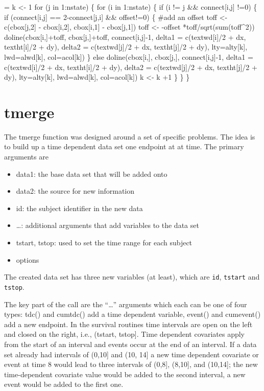 \documentclass{article}
\newcommand{\code}[1]{\texttt{#1}}
\begin{document}
\begin{nwchunk}
=
 k <- 1
 for (j in 1:nstate) \{
     for (i in 1:nstate) \{
         if (i != j && connect[i,j] !=0) \{
             if (connect[i,j] == 2-connect[j,i] && offset!=0) \{
                 #add an offset
                 toff <- c(cbox[j,2] - cbox[i,2], cbox[i,1] - cbox[j,1])
                 toff <- -offset *toff/sqrt(sum(toff^2))
                 doline(cbox[i,]+toff, cbox[j,]+toff, connect[i,j]-1,
                        delta1 = c(textwd[i]/2 + dx, textht[i]/2 + dy),
                        delta2 = c(textwd[j]/2 + dx, textht[j]/2 + dy),
                        lty=alty[k], lwd=alwd[k], col=acol[k])
                 \}
             else doline(cbox[i,], cbox[j,], connect[i,j]-1,
                         delta1 = c(textwd[i]/2 + dx, textht[i]/2 + dy),
                         delta2 = c(textwd[j]/2 + dx, textht[j]/2 + dy),
                         lty=alty[k], lwd=alwd[k], col=acol[k])
             k <- k +1
         \}
     \}
 \}
\end{nwchunk}
\section{tmerge}
The tmerge function was designed around a set of specific problems.
The idea is to build up a time dependent data set one endpoint at at time.
The primary arguments are
\begin{itemize}
  \item data1: the base data set that will be added onto
  \item data2: the source for new information
  \item id: the subject identifier in the new data
  \item \ldots: additional arguments that add variables to the data set
  \item tstart, tstop: used to set the time range for each subject
  \item options
\end{itemize}
The created data set has three new variables (at least), which are
\code{id}, \code{tstart} and \code{tstop}.

The key part of the call are the ``\ldots'' arguments 
which each can be one of four types:
tdc() and cumtdc() add a time dependent variable, event() and cumevent()
add a new endpoint.
In the survival routines time intervals are open on the left and
closed on the right, i.e.,  (tstart, tstop].
Time dependent covariates apply from the start of an interval and events
occur at the end of an interval.
If a data set already had intervals of (0,10] and (10, 14] a new time
dependent covariate or event at time 8 would lead to three intervals of
(0,8], (8,10], and (10,14];
the new time-dependent covariate value would be added to the second interval,
a new event would be added to the first one.
      
\end{document}
